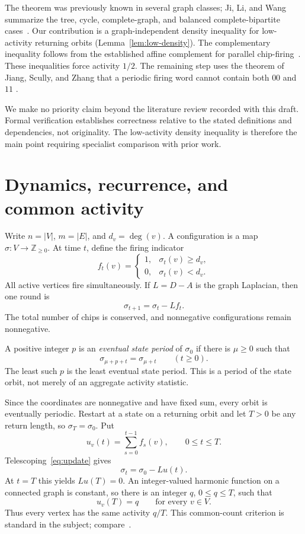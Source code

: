 \documentclass[11pt]{article}
\theoremstyle{definition}
\theoremstyle{remark}
\newcommand{\Z}{\mathbb{Z}}
\begin{document}
The theorem was previously known in several graph classes; Ji, Li, and Wang
summarize the tree, cycle, complete-graph, and balanced complete-bipartite
cases~\cite{JiLiWang2024}. Our contribution is a graph-independent density
inequality for low-activity returning orbits (Lemma~\ref{lem:low-density}).
The complementary inequality follows from the established affine complement
for parallel chip-firing~\cite{Jiang2010}. These inequalities force activity
$1/2$. The remaining step uses the theorem of Jiang, Scully, and Zhang that a
periodic firing word cannot contain both $00$ and $11$
\cite[Theorem~6.2]{JiangScullyZhang2015}.

We make no priority claim beyond the literature review recorded with this
draft. Formal verification establishes correctness relative to the stated
definitions and dependencies, not originality. The low-activity density
inequality is therefore the main point requiring specialist comparison with
prior work.

\section{Dynamics, recurrence, and common activity}

Write $n=|V|$, $m=|E|$, and $d_v=\deg(v)$. A configuration is a map
$\sigma:V\to\Z_{\ge 0}$. At time $t$, define the firing indicator
\[
 f_t(v)=
 \begin{cases}
 1,&\sigma_t(v)\ge d_v,\\
 0,&\sigma_t(v)<d_v.
 \end{cases}
\]
All active vertices fire simultaneously. If $L=D-A$ is the graph Laplacian,
then one round is
\begin{equation}\label{eq:update}
   \sigma_{t+1}=\sigma_t-Lf_t.
\end{equation}
The total number of chips is conserved, and nonnegative configurations remain
nonnegative.

A positive integer $p$ is an \emph{eventual state period} of $\sigma_0$ if
there is $\mu\ge 0$ such that
\[
   \sigma_{\mu+p+t}=\sigma_{\mu+t}\qquad(t\ge 0).
\]
The least such $p$ is the least eventual state period. This is a period of the
state orbit, not merely of an aggregate activity statistic.

Since the coordinates are nonnegative and have fixed sum, every orbit is
eventually periodic. Restart at a state on a returning orbit and let $T>0$ be
any return length, so $\sigma_T=\sigma_0$. Put
\[
   u_v(t)=\sum_{s=0}^{t-1}f_s(v),\qquad 0\le t\le T.
\]
Telescoping~\eqref{eq:update} gives
\begin{equation}\label{eq:telescoping}
   \sigma_t=\sigma_0-Lu(t).
\end{equation}
At $t=T$ this yields $Lu(T)=0$. An integer-valued harmonic function on a
connected graph is constant, so there is an integer $q$, $0\le q\le T$, such
that
\begin{equation}\label{eq:common-count}
   u_v(T)=q\qquad\text{for every }v\in V.
\end{equation}
Thus every vertex has the same activity $q/T$. This common-count criterion is
standard in the subject; compare~\cite{BitarGoles1992,Jiang2010}.
\end{document}
